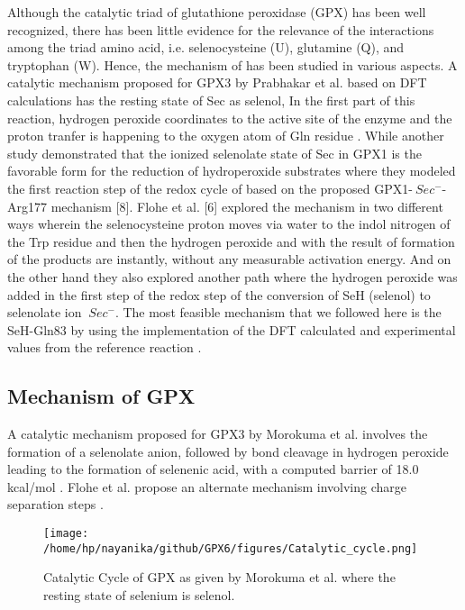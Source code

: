 \documentclass[journal=jacsat,manuscript=article]{achemso}
\begin{document}
Although the catalytic triad of glutathione peroxidase (GPX) has been well recognized, there has been little evidence for the relevance of the interactions among the triad amino acid, i.e. selenocysteine (U), glutamine (Q), and tryptophan (W). Hence, the mechanism of has been studied in various aspects. A catalytic mechanism proposed for GPX3 by Prabhakar et al. based on DFT calculations has the resting state of Sec as selenol, In the first part of this reaction, hydrogen peroxide coordinates to the active site of the enzyme and the proton tranfer is happening to the oxygen atom of Gln residue \cite{prabhakar_elucidation_2005,prabhakar_is_2006}. While another study demonstrated that the ionized selenolate state of Sec in GPX1 is the favorable form for the reduction of hydroperoxide substrates where they modeled the ﬁrst reaction step of the redox cycle of based on the proposed GPX1-\({\ Sec^-}\)- Arg177 mechanism [8]. Flohe et al. [6]\cite{orian_selenocysteine_2015} explored the mechanism in two different ways wherein the selenocysteine proton moves via water to the indol nitrogen of the Trp residue and then the hydrogen peroxide and with the result of formation of  the products are instantly, without any measurable activation energy. And on the other hand they also explored another path where the hydrogen peroxide was added in the first step of the redox step of the conversion of SeH (selenol) to selenolate ion \({\ Sec^-}\)\cite{flohe_glutathione_2022,orian_selenocysteine_2015}. The most feasible mechanism that we followed here is the SeH-Gln83 by using the implementation of the DFT calculated and experimental values from the reference reaction \cite{prabhakar_is_2006}. 

\subsection{Mechanism of GPX}

A catalytic mechanism proposed for GPX3 by Morokuma et al. involves the formation of a selenolate anion, followed by bond cleavage in hydrogen peroxide leading to the formation of selenenic acid, with a computed barrier of 18.0 kcal/mol \cite{Prabhakar2006}. Flohe et al. propose an alternate mechanism involving charge separation steps \cite{Orian2015}.

\begin{figure}[h]
  \texttt{[image: /home/hp/nayanika/github/GPX6/figures/Catalytic\_cycle.png]}
  \caption{Catalytic Cycle of GPX as given by Morokuma et al. where the resting state of selenium is selenol.}
  \label{fig:figure1}
  \end{figure}
  
\end{document}

